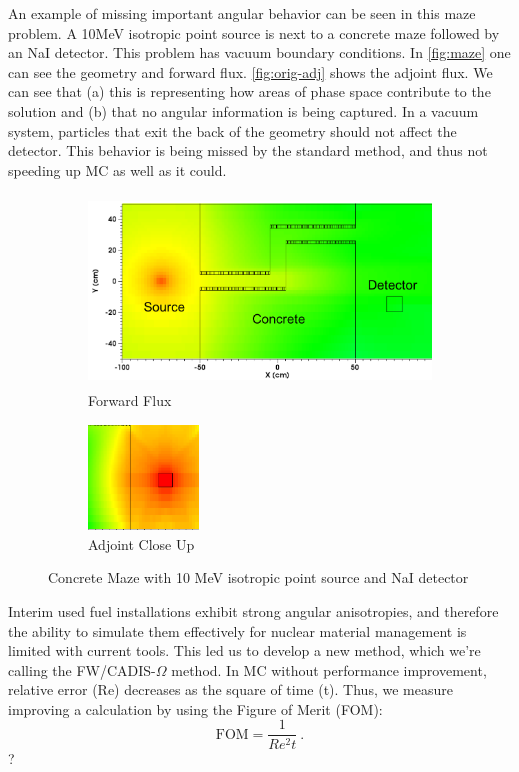 \documentclass[12pt]{article}
\begin{document}
An example of missing important angular behavior can be seen in this maze problem. 
A 10MeV isotropic point source is next to a concrete maze followed by an NaI detector. 
This problem has vacuum boundary conditions. 
In \autoref{fig:maze} one can see the geometry and forward flux. 
\autoref{fig:orig-adj} shows the adjoint flux. 
We can see that (a) this is representing how areas of phase space contribute to the solution and (b) that no angular information is being captured.
In a vacuum system, particles that exit the back of the geometry should not affect the detector. 
This behavior is being missed by the standard method, and thus not speeding up MC as well as it could. 
\begin{figure}
\centering
\begin{subfigure}{.75\textwidth}
  \centering
  \includegraphics[height=2in,clip]{maze-forward.png}
  \caption{Forward Flux}
  \label{fig:maze}
\end{subfigure}%
\begin{subfigure}{.25\textwidth}
  \centering
  \includegraphics[height=1.1in,clip]{maze-adj-orig.png}
  \caption{Adjoint Close Up}
  \label{fig:orig-adj}
\end{subfigure}
\caption{Concrete Maze with 10 MeV isotropic point source and NaI detector}
\label{fig:adjoint}
\end{figure}

Interim used fuel installations exhibit strong angular anisotropies, and therefore the ability to simulate them effectively for nuclear material management is limited with current tools. 
This led us to develop a new method, which we're calling the FW/CADIS-$\Omega$ method. 
In MC without performance improvement, relative error (Re) decreases as the square of time (t). 
Thus, we measure improving a calculation by using the Figure of Merit (FOM):
\begin{equation}
\text{FOM}=\frac{1}{Re^{2}t}\:.
\end{equation}?
\end{document}
